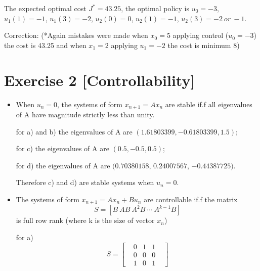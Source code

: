\documentclass[11pt]{article}
\begin{document}
\begin{itemize}
The expected optimal cost $J^{*} = 43.25$, the optimal policy is $u_0 = -3$, $u_1(1) = -1$,  $u_1(3) = -2$,
$u_2(0) = 0$, $u_2(1) = -1$, $u_2(3) = -2\ or\ -1$. 

Correction: (*Again mistakes were made when $x_0 = 5 $ applying control ($u_0 = -3$) the cost is 43.25 and when $x_1 =2$ applying $u_1 = -2$ the cost is minimum 8)
\end{itemize}



\section*{Exercise 2 [Controllability]}

\begin{itemize}
  \item When $u_n = 0$, the systems of form $x_{n+1} = Ax_n$ are stable if.f all eigenvalues of A have magnitude strictly less than unity.
  
  for a) and b) the eigenvalues of A are $(1.61803399, -0.61803399,  1.5)$;

  for c) the eigenvalues of A are $(0.5, -0.5,  0.5)$; 

  for d) the eigenvalues of A are $(0.70380158$,  $0.24007567$, $-0.44387725)$.

  Therefore c) and d) are stable systems when $u_n = 0$.
  \item The systems of form $x_{n+1} = Ax_n+Bu_n$ are controllable if.f the matrix 
  \begin{equation}
  S = [B \ AB\  A^2B\ \cdots\  A^{k-1}B] 
  \end{equation}
  is full row rank (where k is the size of vector $x_n$)
  
  for a) 
  \begin{equation}
  S = \left[\begin{matrix} & 0 & 1 & 1 &\\ & 0 & 0 & 0 &\\ & 1 & 0 & 1 &\end{matrix}\right] \nonumber
  \end{equation}


\end{itemize}
\end{document}
